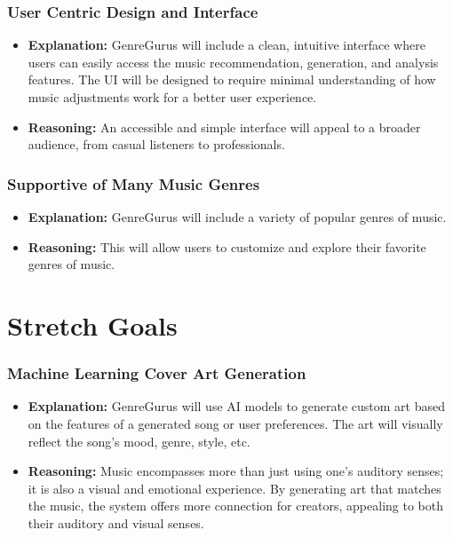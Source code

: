 \documentclass{article}
\begin{document}
\subsubsection*{User Centric Design and Interface}
\begin{itemize}
    \item \textbf{Explanation:} GenreGurus will include a clean, intuitive interface where users can easily access the music recommendation, generation, and analysis features. The UI will be designed to require minimal understanding of how music adjustments work for a better user experience.
    \item \textbf{Reasoning:} An accessible and simple interface will appeal to a broader audience, from casual listeners to professionals.
\end{itemize}

\subsubsection*{Supportive of Many Music Genres}
\begin{itemize}
    \item \textbf{Explanation:} GenreGurus will include a variety of popular genres of music.
    \item \textbf{Reasoning:} This will allow users to customize and explore their favorite genres of music.
\end{itemize}


\section{Stretch Goals}
\subsubsection*{Machine Learning Cover Art Generation}
\begin{itemize}
    \item \textbf{Explanation:} GenreGurus will use AI models to generate custom art based on the features of a generated song or user preferences. The art will visually reflect the song's mood, genre, style, etc.
    \item \textbf{Reasoning:} Music encompasses more than just using one's auditory senses; it is also a visual and emotional experience. By generating art that matches the music, the system offers more connection for creators, appealing to both their auditory and visual senses.
\end{itemize}
\end{document}
